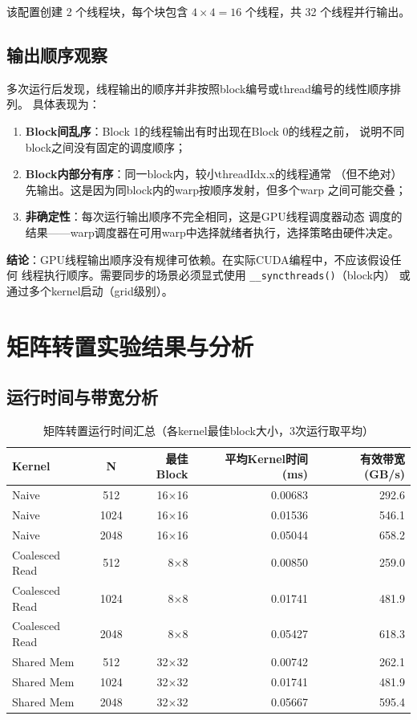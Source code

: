 \documentclass[UTF8,a4paper,12pt,fontset=none]{ctexart}
\begin{document}
该配置创建 2 个线程块，每个块包含 $4 \times 4 = 16$ 个线程，共 32 个线程并行输出。

\subsection{输出顺序观察}

多次运行后发现，线程输出的顺序并非按照block编号或thread编号的线性顺序排列。
具体表现为：

\begin{enumerate}[leftmargin=2.2em]
  \item \textbf{Block间乱序}：Block 1的线程输出有时出现在Block 0的线程之前，
        说明不同block之间没有固定的调度顺序；
  \item \textbf{Block内部分有序}：同一block内，较小threadIdx.x的线程通常
        （但不绝对）先输出。这是因为同block内的warp按顺序发射，但多个warp
        之间可能交叠；
  \item \textbf{非确定性}：每次运行输出顺序不完全相同，这是GPU线程调度器动态
        调度的结果——warp调度器在可用warp中选择就绪者执行，选择策略由硬件决定。
\end{enumerate}

\textbf{结论}：GPU线程输出顺序没有规律可依赖。在实际CUDA编程中，不应该假设任何
线程执行顺序。需要同步的场景必须显式使用 \texttt{\_\_syncthreads()}（block内）
或通过多个kernel启动（grid级别）。

\section{矩阵转置实验结果与分析}

\subsection{运行时间与带宽分析}

\begin{table}[H]
  \centering
  \caption{矩阵转置运行时间汇总（各kernel最佳block大小，3次运行取平均）}
  \label{tab:runtime}
  \begin{tabular}{lcrrr}
    \toprule
    Kernel & N & 最佳Block & 平均Kernel时间(ms) & 有效带宽(GB/s) \\
    \midrule
    Naive & 512 & 16×16 & 0.00683 & 292.6 \\
    Naive & 1024 & 16×16 & 0.01536 & 546.1 \\
    Naive & 2048 & 16×16 & 0.05044 & 658.2 \\
    \midrule
    Coalesced Read & 512 & 8×8 & 0.00850 & 259.0 \\
    Coalesced Read & 1024 & 8×8 & 0.01741 & 481.9 \\
    Coalesced Read & 2048 & 8×8 & 0.05427 & 618.3 \\
    \midrule
    Shared Mem & 512 & 32×32 & 0.00742 & 262.1 \\
    Shared Mem & 1024 & 32×32 & 0.01741 & 481.9 \\
    Shared Mem & 2048 & 32×32 & 0.05667 & 595.4 \\
    \bottomrule
  \end{tabular}
\end{table}
\end{document}
